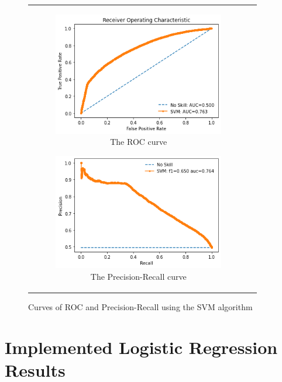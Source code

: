 \begin{figure}[H]
\begin{tabular}{@{}cc@{}}
\begin{subfigure}{0.5\textwidth}
  \centering
  \includegraphics[width=7.5cm]{fig/chapter5/SVM/ROC_new.png}
  \caption{\footnotesize{The \acrshort{ROC} curve}}
  \label{fig:svmroc}
\end{subfigure} 
\begin{subfigure}{0.5\textwidth}
  \centering
  \includegraphics[width=7.5cm]{fig/chapter5/SVM/Precision-Recall_new.png}
  \caption{\footnotesize{The Precision-Recall curve}}
  \label{fig:svmprerec}
\end{subfigure} \\
\end{tabular}
\caption{Curves of \acrshort{ROC} and Precision-Recall using the \acrshort{SVM} algorithm}
\label{fig:svmcurves}
\end{figure}

\section{Implemented Logistic Regression Results}


